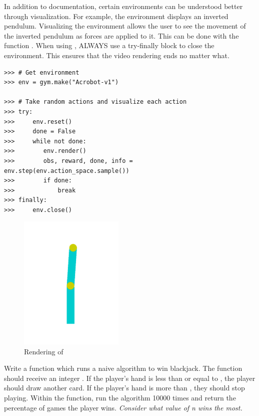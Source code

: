In addition to documentation, certain environments can be understood better through visualization.
For example, the environment  displays an inverted pendulum.
Visualizing the environment allows the user to see the movement of the inverted pendulum as forces are applied to it.
This can be done with the function .
When using , ALWAYS use a try-finally block to close the environment.
This ensures that the video rendering ends no matter what.

\begin{lstlisting}
>>> # Get environment
>>> env = gym.make("Acrobot-v1")

>>> # Take random actions and visualize each action
>>> try:
>>>     env.reset()
>>>     done = False
>>>     while not done:
>>>        env.render()
>>>        obs, reward, done, info = env.step(env.action_space.sample())
>>>        if done:
>>>            break
>>> finally:
>>>     env.close()
\end{lstlisting}

\begin{figure}[H]
\includegraphics[width=5cm]{figures/acrobot.pdf}
\caption{Rendering of }
\end{figure}

\begin{problem}
Write a function  which runs a naive algorithm to win blackjack.
The function should receive an integer .
If the player's hand is less than or equal to , the player should draw another card.
If the player's hand is more than , they should stop playing.
Within the function, run the algorithm 10000 times and return the percentage of games the player wins.
\textit{Consider what value of n wins the most.}

\label{prob:blackjack}
\end{problem}

